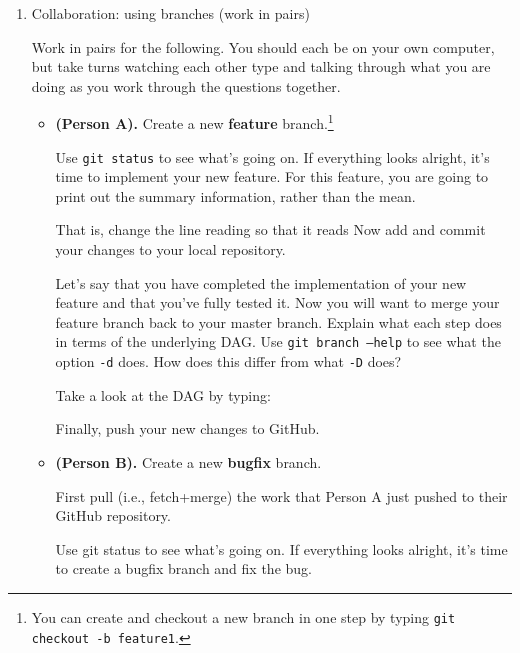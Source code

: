\documentclass{article}
\begin{document}
\begin{enumerate}
\item Collaboration: using branches (work in pairs)

Work in pairs for the following. You should each be on your own computer,
but take turns watching each other type and talking through what you
are doing as you work through the questions together.

\begin{itemize}
\item \textbf{(Person A).} Create a new \textbf{feature} branch.\footnote{You can create and checkout a new branch in one step by typing \texttt{git checkout -b feature1}.}


Use \texttt{git status} to see what's going on. If everything looks
alright, it's time to implement your new feature.  For this feature, you
are going to print out the summary information, rather than the mean.

That is, change the line reading
so that it reads
Now add and commit your changes to your local repository.

Let's say that you have completed the implementation of your new feature
and that you've fully tested it.  Now you will want to merge your feature
branch back to your master branch.
Explain what each step does in terms of the underlying DAG.
Use \texttt{git branch --help} to see what the option
\texttt{-d} does.  How does this differ from what \texttt{-D} does?

Take a look at the DAG by typing:

Finally, push your new changes to GitHub.

\item \textbf{(Person B).} Create a new \textbf{bugfix} branch.

First pull (i.e., fetch+merge) the work that Person A just pushed
to their GitHub repository. 

Use git status to see what’s going on. If everything looks alright,
it’s time to create a bugfix branch and fix the bug.


\end{itemize}
\end{enumerate}
\end{document}

